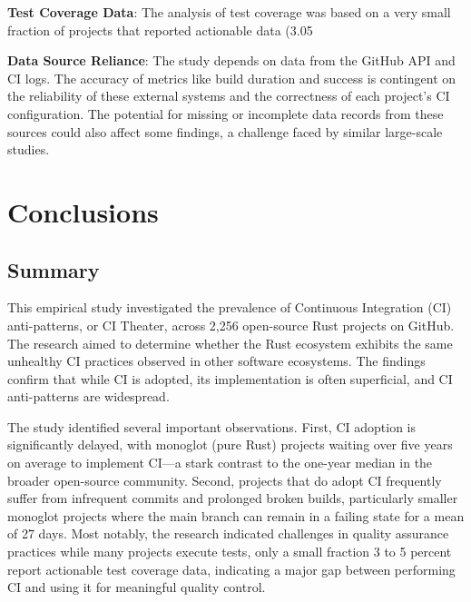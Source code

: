 \documentclass[11pt]{article}
\begin{document}
\textbf{Test Coverage Data}: The analysis of test coverage was based on a very small fraction of projects that reported actionable data (3.05%

\textbf{Data Source Reliance}: The study depends on data from the GitHub API and CI logs. The accuracy of metrics like build duration and success is contingent on the reliability of these external systems and the correctness of each project's CI configuration. The potential for missing or incomplete data records from these sources could also affect some findings, a challenge faced by similar large-scale studies.

\section{Conclusions}
\subsection{Summary}

This empirical study investigated the prevalence of Continuous Integration (CI) anti-patterns, or CI Theater, across 2,256 open-source Rust projects on GitHub. The research aimed to determine whether the Rust ecosystem exhibits the same unhealthy CI practices observed in other software ecosystems. The findings confirm that while CI is adopted, its implementation is often superficial, and CI anti-patterns are widespread.

The study identified several important observations. First, CI adoption is significantly delayed, with monoglot (pure Rust) projects waiting over five years on average to implement CI—a stark contrast to the one-year median in the broader open-source community. Second, projects that do adopt CI frequently suffer from infrequent commits and prolonged broken builds, particularly smaller monoglot projects where the main branch can remain in a failing state for a mean of 27 days. Most notably, the research indicated challenges in quality assurance practices while many projects execute tests, only a small fraction 3 to 5 percent report actionable test coverage data, indicating a major gap between performing CI and using it for meaningful quality control.
\end{document}
